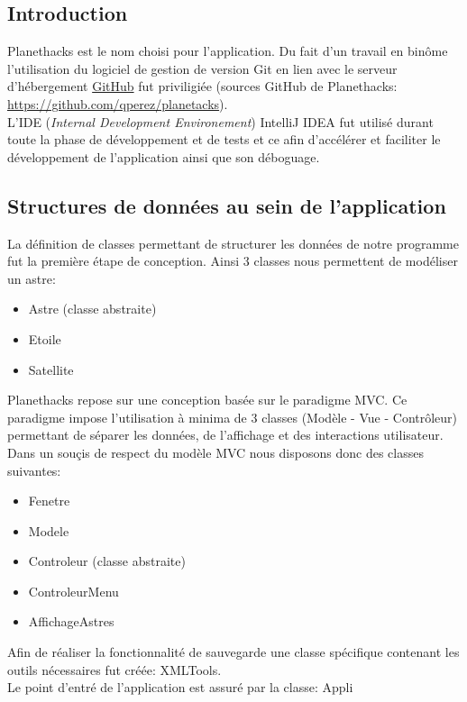 \documentclass[a4paper,10pt]{article}
\begin{document}
\subsection{Introduction}
Planethacks est le nom choisi pour l'application. Du fait d'un travail en binôme l'utilisation
du logiciel de gestion de version Git en lien avec le serveur d'hébergement \href{https://github.com}{GitHub} fut priviligiée (sources GitHub de Planethacks: \url{https://github.com/qperez/planetacks}). \\
L'IDE (\textit{Internal Development Environement}) IntelliJ IDEA fut utilisé durant toute la phase de développement et de tests et ce afin 
d'accélérer et faciliter le développement de l'application ainsi que son déboguage.

\subsection{Structures de données au sein de l'application}
La définition de classes permettant de structurer les données de notre programme fut la première étape de conception. Ainsi 3 classes 
nous permettent de modéliser un astre:
\begin{itemize}
  \item Astre (classe abstraite)
  \item Etoile
  \item Satellite
\end{itemize}

Planethacks repose sur une conception basée sur le paradigme MVC. Ce paradigme impose l'utilisation à minima de 3 classes (Modèle - Vue - Contrôleur) permettant de
séparer les données, de l'affichage et des interactions utilisateur. \\ 
Dans un souçis de respect du modèle MVC nous disposons donc des classes suivantes:
\begin{itemize}
  \item Fenetre
  \item Modele
  \item Controleur (classe abstraite)
  \item ControleurMenu
  \item AffichageAstres
\end{itemize}

Afin de réaliser la fonctionnalité de sauvegarde une classe spécifique contenant les outils nécessaires fut créée: XMLTools. \\
Le point d'entré de l'application est assuré par la classe: Appli
\end{document}
